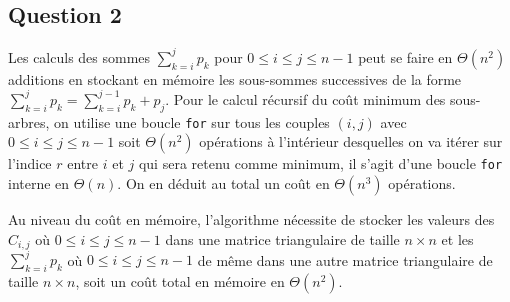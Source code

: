 \documentclass[a4paper,10pt,french]{article}
\def\saut#1{\vspace{#1\baselineskip}}
\begin{document}
\subsection*{Question 2}

Les calculs des sommes $\sum_{k=i}^jp_k$ pour $0\leq i\leq j\leq n-1$ peut se faire en $\Theta(n^2)$ additions en stockant en mémoire les sous-sommes successives de la forme $\sum_{k=i}^jp_k=\sum_{k=i}^{j-1}p_k+p_j$.
Pour le calcul récursif du coût minimum des sous-arbres, on utilise une boucle \texttt{for} sur tous les couples $(i,j)$ avec $0\leq i\leq j\leq n-1$ soit $\Theta(n^2)$ opérations à l'intérieur desquelles on va itérer sur l'indice $r$ entre $i$ et $j$ qui sera retenu comme minimum, il s'agit d'une boucle \texttt{for} interne en $\Theta(n)$.
On en déduit au total un coût en $\Theta(n^3)$ opérations.

\saut{1}

Au niveau du coût en mémoire, l'algorithme nécessite de stocker les valeurs des $C_{i,j}$ où $0\leq i\leq j\leq n-1$ dans une matrice triangulaire de taille $n\times n$ et les $\sum_{k=i}^jp_k$ où $0\leq i\leq j\leq n-1$ de même dans une autre matrice triangulaire de taille $n\times n$, soit un coût total en mémoire en $\Theta(n^2)$.
\end{document}
